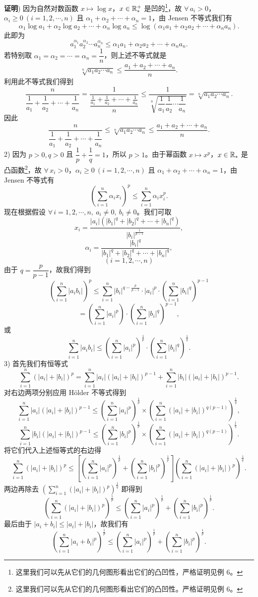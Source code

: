 \textbf{证明}) 因为自然对数函数 \(x\longmapsto\log x\)，\(x\in\mathbb{R}_*^+\) 是凹的\footnote{这里我们可以先从它们的几何图形看出它们的凸凹性，严格证明见例 6。}，故 \(\forall\,a_i>0\)，\(\alpha_i\ge0\ (i=1,2,\cdots,n)\) 且 \(\alpha_1+\alpha_2+\cdots+\alpha_n=1\)，由 Jensen 不等式我们有
\[
\alpha_1\log a_1+\alpha_2\log a_2+\cdots+\alpha_n\log a_n\le\log(\alpha_1a_1+\alpha_2a_2+\cdots+\alpha_na_n).
\]
此即为
\[
a_1^{\alpha_1}a_2^{\alpha_2}\cdots a_n^{\alpha_n}\le\alpha_1a_1+\alpha_2a_2+\cdots+\alpha_na_n.
\]
若特别取 \(\alpha_1=\alpha_2=\cdots=\alpha_n=\dfrac1n\)，则上述不等式就是
\[
\sqrt[n]{a_1a_2\cdots a_n}\le\frac{a_1+a_2+\cdots+a_n}{n}.
\]
利用此不等式我们得到
\[
\frac{n}{\dfrac1{a_1}+\dfrac1{a_2}+\cdots+\dfrac1{a_n}}=\frac1{\dfrac{\frac1{a_1}+\frac1{a_2}+\cdots+\frac1{a_n}}{n}}\le\frac1{\sqrt[n]{\dfrac1{a_1}\dfrac1{a_2}\cdots\dfrac1{a_n}}}=\sqrt[n]{a_1a_2\cdots a_n}.
\]
因此
\[
\frac{n}{\dfrac1{a_1}+\dfrac1{a_2}+\cdots+\dfrac1{a_n}}\le\sqrt[n]{a_1a_2\cdots a_n}\le\frac{a_1+a_2+\cdots+a_n}{n}.
\]
2) 因为 \(p>0,q>0\) 且 \(\dfrac1p+\dfrac1q=1\)，所以 \(p>1\)。由于幂函数 \(x\longmapsto x^p\)，\(x\in\mathbb{R}_*\) 是凸函数\footnote{这里我们可以先从它们的几何图形看出它们的凸凹性。严格证明见例 6。}，故 \(\forall\,x_i>0\)，\(\alpha_i\ge0\ (i=1,2,\cdots,n)\) 且 \(\alpha_1+\alpha_2+\cdots+\alpha_n=1\)，由 Jensen 不等式有
\[
\left(\sum_{i=1}^n\alpha_ix_i\right)^p\le\sum_{i=1}^n\alpha_ix_i^p.
\]
现在根据假设 \(\forall\,i=1,2,\cdots,n,\ a_i\neq0,\ b_i\neq0\)。我们可取
\[
x_i=\frac{|a_i|(|b_1|^q+|b_2|^q+\cdots+|b_n|^q)}{|b_i|^{\frac1{p-1}}},
\]
\[
\alpha_i=\frac{|b_i|^q}{|b_1|^q+|b_2|^q+\cdots+|b_n|^q},
\]
\[
(i=1,2,\cdots,n)
\]
由于 \(q=\dfrac{p}{p-1}\)，故我们得到
\[
\left(\sum_{i=1}^n|a_ib_i|\right)^p\le\sum_{i=1}^n|b_i|^{q-\frac p{p-1}}\cdot|a_i|^p\cdot\left(\sum_{i=1}^n|b_i|^q\right)^{p-1}
\]
\[
=\left(\sum_{i=1}^n|a_i|^p\right)\cdot\left(\sum_{i=1}^n|b_i|^q\right)^{p-1},
\]
或
\[
\sum_{i=1}^n|a_ib_i|\le\left(\sum_{i=1}^n|a_i|^p\right)^{\frac1p}\cdot\left(\sum_{i=1}^n|b_i|^q\right)^{\frac1q}.
\]
3) 首先我们有恒等式
\[
\sum_{i=1}^n(|a_i|+|b_i|)^p=\sum_{i=1}^n|a_i|(|a_i|+|b_i|)^{p-1}+\sum_{i=1}^n|b_i|(|a_i|+|b_i|)^{p-1}.
\]
对右边两项分别应用 Hölder 不等式得到
\[
\sum_{i=1}^n|a_i|(|a_i|+|b_i|)^{p-1}\le\left(\sum_{i=1}^n|a_i|^p\right)^{\frac1p}\times\left(\sum_{i=1}^n(|a_i|+|b_i|)^{q(p-1)}\right)^{\frac1q},
\]
\[
\sum_{i=1}^n|b_i|(|a_i|+|b_i|)^{p-1}\le\left(\sum_{i=1}^n|b_i|^p\right)^{\frac1p}\times\left(\sum_{i=1}^n(|a_i|+|b_i|)^{q(p-1)}\right)^{\frac1q}.
\]
将它们代入上述恒等式的右边得
\[
\sum_{i=1}^n(|a_i|+|b_i|)^p\le\left[\left(\sum_{i=1}^n|a_i|^p\right)^{\frac1p}+\left(\sum_{i=1}^n|b_i|^p\right)^{\frac1p}\right]\left(\sum_{i=1}^n(|a_i|+|b_i|)^p\right)^{\frac1q}.
\]
两边再除去 \(\left(\sum_{i=1}^n(|a_i|+|b_i|)^p\right)^{\frac1q}\) 即得到
\[
\left(\sum_{i=1}^n(|a_i|+|b_i|)^p\right)^{\frac1p}\le\left(\sum_{i=1}^n|a_i|^p\right)^{\frac1p}+\left(\sum_{i=1}^n|b_i|^p\right)^{\frac1p}.
\]
最后由于 \(|a_i+b_i|\le|a_i|+|b_i|\)，故我们有
\[
\left(\sum_{i=1}^n|a_i+b_i|^p\right)^{\frac1p}\le\left(\sum_{i=1}^n|a_i|^p\right)^{\frac1p}+\left(\sum_{i=1}^n|b_i|^p\right)^{\frac1p}.
\]

